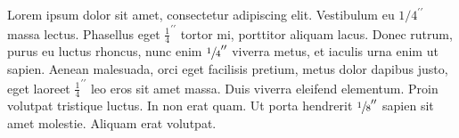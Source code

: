 \documentclass{article}
\begin{document}
Lorem ipsum dolor sit amet, consectetur adipiscing elit. Vestibulum eu $1/4^{\prime\prime}$ massa lectus. 
Phasellus eget $\frac{1}{4}^{\prime\prime}$ tortor mi, porttitor aliquam lacus. Donec rutrum, purus eu luctus rhoncus, 
nunc enim $\sfrac{1}{4}''$ viverra metus, et iaculis urna enim ut sapien. Aenean malesuada, orci eget 
facilisis pretium, metus dolor dapibus justo, eget laoreet $\frac{1}{4}^{\prime\prime}$ leo eros sit amet massa. 
Duis viverra eleifend elementum. Proin volutpat tristique luctus. In non erat quam. 
Ut porta hendrerit $\sfrac{1}{8}''$ sapien sit amet molestie. Aliquam erat volutpat.
\end{document}
